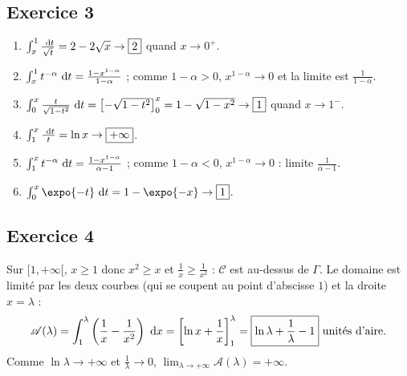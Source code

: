 \begin{corrige}
\subsection*{Exercice 3}
\begin{enumerate}
\item $\int_x^1 \frac{~\mathrm{d}t}{\sqrt{t}} = 2 - 2\sqrt{x} \to \boxed{2}$ quand $x\to 0^+$.
\item $\int_x^1 t^{-\alpha}~\mathrm{d}t = \frac{1 - x^{1-\alpha}}{1-\alpha}$ ; comme $1 - \alpha > 0$, $x^{1-\alpha}\to 0$ et la limite est $\boxed{\frac{1}{1-\alpha}}$.
\item $\int_0^x \frac{t}{\sqrt{1-t^2}}~\mathrm{d}t = \left[-\sqrt{1-t^2}\right]_0^x = 1 - \sqrt{1-x^2} \to \boxed{1}$ quand $x\to 1^-$.
\item $\int_1^x \frac{~\mathrm{d}t}{t} = \ln x \to \boxed{+\infty}$.
\item $\int_1^x t^{-\alpha}~\mathrm{d}t = \frac{1 - x^{1-\alpha}}{\alpha - 1}$ ; comme $1-\alpha<0$, $x^{1-\alpha}\to 0$ : limite $\boxed{\frac{1}{\alpha-1}}$.
\item $\int_0^x \expo{-t}\dt = 1 - \expo{-x}\to\boxed{1}$.
\end{enumerate}

\subsection*{Exercice 4}
Sur $[1,+\infty[$, $x \geq 1$ donc $x^2 \geq x$ et $\frac{1}{x} \geq \frac{1}{x^2}$ : $\mathscr{C}$ est au-dessus de $\Gamma$.
Le domaine est limit\'e par les deux courbes (qui se coupent au point d'abscisse $1$) et la droite $x = \lambda$ :
\[
\mathscr{A}(\lambda) = \int_1^\lambda\left(\frac{1}{x} - \frac{1}{x^2}\right)~\mathrm{d}x = \left[\ln x + \frac{1}{x}\right]_1^\lambda
= \boxed{\ln\lambda + \frac{1}{\lambda} - 1} \text{ unit\'es d'aire.}
\]
Comme $\ln\lambda\to+\infty$ et $\frac{1}{\lambda}\to 0$, $\lim_{\lambda\to+\infty}\mathscr{A}(\lambda) = +\infty$.


\end{corrige}
